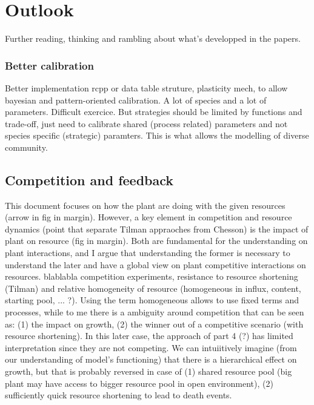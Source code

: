 

\chapter{Outlook}

Further reading, thinking and rambling about what's developped in the papers.



\subsection{Better calibration}

Better implementation rcpp or data table struture, plasticity mech, to allow bayesian and pattern-oriented calibration. A lot of species and a lot of parameters. Difficult exercice. But strategies should be limited by functions and trade-off, just need to calibrate shared (process related) parameters and not species specific (strategic) paramters. This is what allows the modelling of diverse community. 


\section{Competition and feedback}
This document focuses on how the plant are doing with the given resources (arrow in fig in margin). However, a key element in competition and resource dynamics (point that separate Tilman appraoches from Chesson) is the impact of plant on resource (fig in margin). Both are fundamental for the understanding on plant interactions, and I argue that understanding the former is necessary to understand the later and have a global view on plant competitive interactions on resources. blablabla competition experiments, resistance to resource shortening (Tilman) and relative homogeneity of resource (homogeneous in influx, content, starting pool, ... ?). Using the term homogeneous allows to use fixed terms and processes, while to me there is a ambiguity around competition that can be seen as: (1) the impact on growth, (2) the winner out of a competitive scenario (with resource shortening). In this later case, the approach of part 4 (?) has limited interpretation since they are not competing. We can intuiitively imagine (from our understanding of model's functioning) that  there is a hierarchical effect on growth, but that is probably reversed in case of (1) shared resource pool (big plant may have access to bigger resource pool in open environment), (2) sufficiently quick resource shortening to lead to death events.\\

